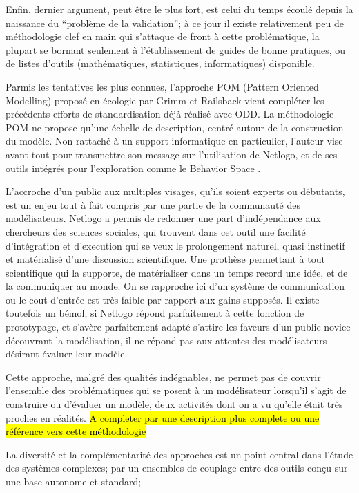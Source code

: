 Enfin, dernier argument, peut être le plus fort, est celui du temps écoulé depuis la naissance du \enquote{problème de la validation}; à ce jour il existe relativement peu de méthodologie clef en main qui s'attaque de front à cette problématique, la plupart se bornant seulement à l'établissement de guides de bonne pratiques, ou de listes d'outils (mathématiques, statistiques, informatiques) disponible.

Parmis les tentatives les plus connues, l'approche POM (Pattern Oriented Modelling) proposé en écologie par Grimm et Railsback vient compléter les précédents efforts de standardisation déjà réalisé avec ODD. La méthodologie POM ne propose qu'une échelle de description, centré autour de la construction du modèle. Non rattaché à un support informatique en particulier, l'auteur vise avant tout pour transmettre son message sur l'utilisation de Netlogo, et de ses outils intégrés pour l'exploration comme le Behavior Space \autocite{Grimm2011}. 

L'accroche d'un public aux multiples visages, qu'ils soient experts ou débutants, est un enjeu tout à fait compris par une partie de la communauté des modélisateurs. Netlogo a permis de redonner une part d'indépendance aux chercheurs des sciences sociales, qui trouvent dans cet outil une facilité d'intégration et d'execution qui se veux le prolongement naturel, quasi instinctif et matérialisé d'une discussion scientifique. Une prothèse permettant à tout scientifique qui la supporte, de matérialiser dans un temps record une idée, et de la communiquer au monde. On se rapproche ici d'un système de communication ou le cout d'entrée est très faible par rapport aux gains supposés. Il existe toutefois un bémol, si Netlogo répond parfaitement à cette fonction de prototypage, et s'avère parfaitement adapté s'attire les faveurs d'un public novice découvrant la modélisation, il ne répond pas aux attentes des modélisateurs désirant évaluer leur modèle.

Cette approche, malgré des qualités indégnables, ne permet pas de couvrir l'ensemble des problématiques qui se posent à un modélisateur lorsqu'il s'agit de construire ou d'évaluer un modèle, deux activités dont on a vu qu'elle était très proches en réalités. \hl{A completer par une description plus complete ou une référence vers cette méthodologie} 

La diversité et la complémentarité des approches est un point central dans l'étude des systèmes complexes; par un ensembles de couplage entre des outils conçu sur une base autonome et standard;


